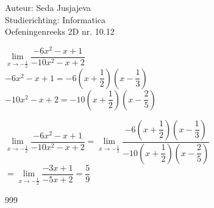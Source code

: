\documentclass[a4paper]{article}
\begin{document}
\noindent \large Auteur: Seda Jusjajeva\\
\noindent \large Studierichting: Informatica\\
\noindent \large Oefeningenreeks 2D nr. 10.12 \\

\medskip

\normalsize


$\lim\limits_{x \rightarrow -\tfrac{1}{2}} \dfrac{-6x^2-x+1}{-10x^2-x+2}$ \\

$-6x^2 - x + 1 = -6\left(x+\dfrac{1}{2}\right)\left(x-\dfrac{1}{3}\right)$ \\

$-10x^2 - x + 2 = -10\left(x+\dfrac{1}{2}\right)\left(x-\dfrac{2}{5}\right)$

$\lim\limits_{x \rightarrow -\tfrac{1}{2}} \dfrac{-6x^2-x+1}{-10x^2-x+2} = \lim\limits_{x \rightarrow -\tfrac{1}{2}} \dfrac{-6\left(x+\dfrac{1}{2}\right)\left(x-\dfrac{1}{3}\right)}{-10\left(x+\dfrac{1}{2}\right)\left(x-\dfrac{2}{5}\right)} $ \\

$= \lim\limits_{x \rightarrow -\tfrac{1}{2}} \dfrac{-3x+1}{-5x+2} = \dfrac{5}{9}$ \\




\begin{thebibliography}{999}
\end{thebibliography}
\end{document}
